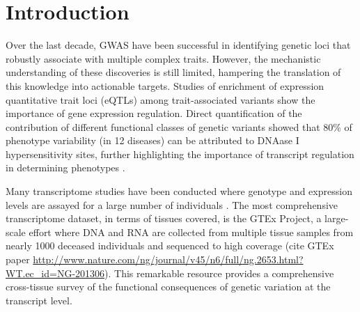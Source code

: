 \documentclass[10pt]{article}
\begin{document}



%
\section*{Introduction}
%
Over the last decade, GWAS have been successful in identifying genetic loci that robustly associate with multiple complex traits. However, the mechanistic understanding of these discoveries is still limited, hampering the translation of this knowledge into actionable targets. Studies of enrichment of expression quantitative trait loci (eQTLs) among trait-associated variants \cite{nicolae, 20369019 , 20369022} show the importance of gene expression regulation. Direct quantification of the contribution of different functional classes of genetic variants showed that 80\% of phenotype variability (in 12 diseases) can be attributed to DNAase I hypersensitivity sites, further highlighting the importance of transcript regulation in determining phenotypes \cite{gusev AJHG h2 paper, 25439723}.

Many transcriptome studies have been conducted where genotype and expression levels are assayed for a large number of individuals \cite{24092820 , 24037378 , 25685889 , 22532805 }. The most comprehensive transcriptome dataset, in terms of tissues covered, is the GTEx Project, a large-scale effort where DNA and RNA are collected from multiple tissue samples from nearly 1000 deceased individuals  and sequenced to high coverage (cite GTEx paper \url{http://www.nature.com/ng/journal/v45/n6/full/ng.2653.html?WT.ec_id=NG-201306}). This remarkable resource provides a comprehensive cross-tissue survey of the functional consequences of genetic variation at the transcript level.
%
%
%
% 
\end{document}
